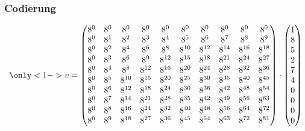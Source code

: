 \documentclass[11pt,aspectratio=169]{beamer}
\begin{document}
	\begin{frame}
		\frametitle{Codierung}
		
		\begin{itemize}
			
			
		\end{itemize}
		
		\[
		\only<1->{
		v = \begin{pmatrix}
			8^0&    8^0&    8^0&    8^0&    8^0&    8^0&    8^0&    8^0&    8^0&    8^0\\
			8^0&	8^1&	8^2&	8^3&	8^4&	8^5&	8^6&	8^7&    8^8&	8^9\\
			8^0&	8^2&	8^4&	8^6&	8^8& 8^{10}& 8^{12}& 8^{14}& 8^{16}& 8^{18}\\
			8^0&	8^3&	8^6&	8^9& 8^{12}& 8^{15}& 8^{18}& 8^{21}& 8^{24}& 8^{27}\\
			8^0&	8^4&	8^8& 8^{12}& 8^{16}& 8^{20}& 8^{24}& 8^{28}& 8^{32}& 8^{36}\\
			8^0&	8^5& 8^{10}& 8^{15}& 8^{20}& 8^{25}& 8^{30}& 8^{35}& 8^{40}& 8^{45}\\
			8^0&	8^6& 8^{12}& 8^{18}& 8^{24}& 8^{30}& 8^{36}& 8^{42}& 8^{48}& 8^{54}\\
			8^0&	8^7& 8^{14}& 8^{21}& 8^{28}& 8^{35}& 8^{42}& 8^{49}& 8^{56}& 8^{63}\\
			8^0&	8^8& 8^{16}& 8^{24}& 8^{32}& 8^{40}& 8^{48}& 8^{56}& 8^{64}& 8^{72}\\
			8^0&	8^9& 8^{18}& 8^{27}& 8^{36}& 8^{45}& 8^{54}& 8^{63}& 8^{72}& 8^{81}\\
		\end{pmatrix}
		\cdot
		\begin{pmatrix}
			1 \\ 8 \\ 5 \\ 2 \\ 7 \\ 4 \\ 0 \\ 0 \\ 0 \\ 0 \\
		\end{pmatrix}
		}
		\]
		\only<1->{
		\begin{itemize}
			\item $v = [5,3,6,5,2,10,2,7,10,4]$
		\end{itemize}
		}	
	\end{frame}
\end{document}
